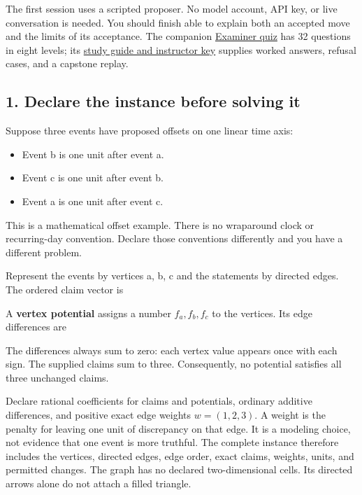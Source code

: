 \documentclass[
  11pt,
]{article}
\providecommand{\tightlist}{%
  \setlength{\itemsep}{0pt}\setlength{\parskip}{0pt}}
\newcommand{\PfpDisplayMath}[1]{%
  \sbox{\PfpMathBox}{$\displaystyle #1$}%
  \ifdim\wd\PfpMathBox>\linewidth
    \resizebox{\linewidth}{!}{\usebox{\PfpMathBox}}%
  \else\usebox{\PfpMathBox}\fi}
\begin{document}
The first session uses a scripted proposer. No model account, API key,
or live conversation is needed. You should finish able to explain both
an accepted move and the limits of its acceptance. The companion
\href{_lev_examiner_theoretical_minimum_quiz/quiz.md}{Examiner quiz} has 32
questions in eight levels; its
\href{_lev_examiner_theoretical_minimum_quiz/study_guide.md}{study guide
and instructor key} supplies worked answers, refusal cases, and a
capstone replay.

\subsection{1. Declare the instance before solving
it}\label{declare-the-instance-before-solving-it}

Suppose three events have proposed offsets on one linear time axis:

\begin{itemize}
\tightlist
\item
  Event b is one unit after event a.
\item
  Event c is one unit after event b.
\item
  Event a is one unit after event c.
\end{itemize}

This is a mathematical offset example. There is no wraparound clock or
recurring-day convention. Declare those conventions differently and you
have a different problem.

Represent the events by vertices a, b, c and the statements by directed
edges. The ordered claim vector is

\begin{center}\PfpDisplayMath{
c=(c_{ab},c_{bc},c_{ca})=(1,1,1).
}\end{center}

A \textbf{vertex potential} assigns a number
\(f_a,\allowbreak f_b,\allowbreak f_c\) to the vertices. Its edge
differences are

\begin{center}\PfpDisplayMath{
df=(f_b-f_a,\ f_c-f_b,\ f_a-f_c).
}\end{center}

The differences always sum to zero: each vertex value appears once with
each sign. The supplied claims sum to three. Consequently, no potential
satisfies all three unchanged claims.

Declare rational coefficients for claims and potentials, ordinary
additive differences, and positive exact edge weights
\(w=(1,\allowbreak 2,\allowbreak 3)\). A weight is the penalty for
leaving one unit of discrepancy on that edge. It is a modeling choice,
not evidence that one event is more truthful. The complete instance
therefore includes the vertices, directed edges, edge order, exact
claims, weights, units, and permitted changes. The graph has no declared
two-dimensional cells. Its directed arrows alone do not attach a filled
triangle.
\end{document}
